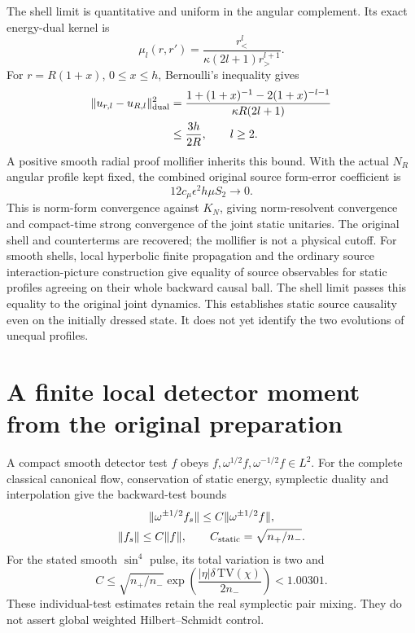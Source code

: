 The shell limit is quantitative and uniform in the angular complement.
Its exact energy-dual kernel is
\[
 \mu_l(r,r')=\frac{r_<^l}{\kappa(2l+1)r_>^{l+1}}.
\]
For $r=R(1+x)$, $0\le x\le h$, Bernoulli's inequality gives
\[
 \begin{aligned}
 \|u_{r,l}-u_{R,l}\|_{\rm dual}^2
 &=\frac{1+(1+x)^{-1}-2(1+x)^{-l-1}}{\kappa R(2l+1)}\\
 &\le\frac{3h}{2R},\qquad l\ge2.
 \end{aligned}
\]
A positive smooth radial proof mollifier inherits this bound. With the
actual $N_R$ angular profile kept fixed, the combined original source
form-error coefficient is
\[
              12c_\mu\epsilon^2h\mu S_2\longrightarrow0.
\]
This is norm-form convergence against $K_N$, giving norm-resolvent
convergence and compact-time strong convergence of the joint static
unitaries. The original shell and counterterms are recovered; the
mollifier is not a physical cutoff.
For smooth shells, local hyperbolic finite propagation and the ordinary
source interaction-picture construction give equality of source
observables for static profiles agreeing on their whole backward causal
ball. The shell limit passes this equality to the original joint dynamics.
This establishes static source causality even on the initially dressed
state. It does not yet identify the two evolutions of unequal profiles.

\section{A finite local detector moment from the original preparation}
A compact smooth detector test $f$ obeys
$f,\omega^{1/2}f,\omega^{-1/2}f\in L^2$.
For the complete classical canonical flow, conservation of static energy,
symplectic duality and interpolation give the backward-test bounds
\[
 \begin{gathered}
 \|\omega^{\pm1/2}f_s\|\le C\|\omega^{\pm1/2}f\|,\\
 \|f_s\|\le C\|f\|,\qquad C_{\rm static}=\sqrt{n_+/n_-}.
 \end{gathered}
\]
For the stated smooth $\sin^4$ pulse, its total variation is two and
\[
 C\le\sqrt{n_+/n_-}
       \exp\!\left(\frac{|\eta|\delta\,\mathrm{TV}(\chi)}{2n_-}\right)
       <1.00301.
\]
These individual-test estimates retain the real symplectic pair mixing.
They do not assert global weighted Hilbert--Schmidt control.

